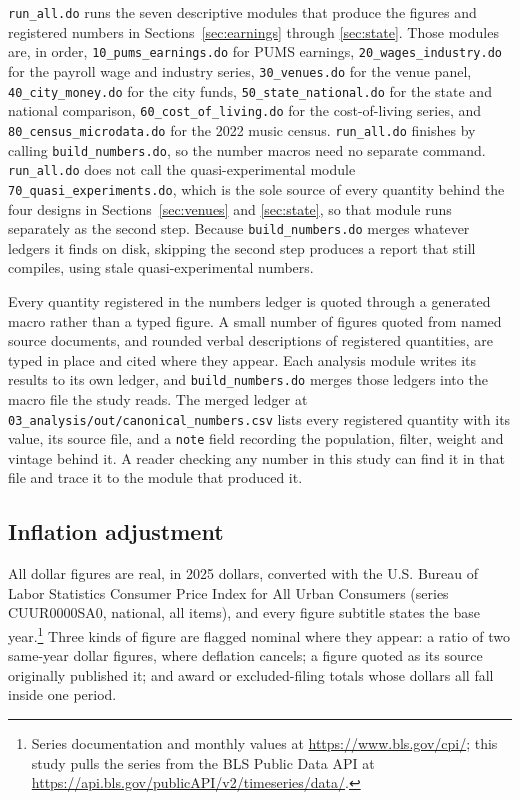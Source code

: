 \texttt{run\_all.do} runs the seven descriptive modules that produce the
figures and registered numbers in Sections~\ref{sec:earnings} through
\ref{sec:state}. Those modules are, in order,
\texttt{10\_pums\_earnings.do} for PUMS earnings,
\texttt{20\_wages\_industry.do} for the payroll wage and industry series,
\texttt{30\_venues.do} for the venue panel,
\texttt{40\_city\_money.do} for the city funds,
\texttt{50\_state\_national.do} for the state and national comparison,
\texttt{60\_cost\_of\_living.do} for the cost-of-living series, and
\texttt{80\_census\_microdata.do} for the 2022 music census.
\texttt{run\_all.do} finishes by calling
\texttt{build\_numbers.do}, so the number macros need no separate command.
\texttt{run\_all.do} does not call the quasi-experimental module
\texttt{70\_quasi\_experiments.do}, which is the sole source of every quantity
behind the four designs in Sections~\ref{sec:venues} and \ref{sec:state}, so
that module runs separately as the second step. Because
\texttt{build\_numbers.do} merges whatever ledgers it finds on disk, skipping
the second step produces a report that still compiles, using stale
quasi-experimental numbers.

Every quantity registered in the numbers ledger is quoted through a generated
macro rather than a typed figure. A small number of figures quoted from named
source documents, and rounded verbal descriptions of registered quantities,
are typed in place and cited where they appear. Each analysis module writes
its results to its own ledger, and \texttt{build\_numbers.do} merges those
ledgers into the macro file the study reads. The merged ledger at
\texttt{03\_analysis/out/canonical\_numbers.csv} lists every registered
quantity with its value, its source file, and a \texttt{note} field recording
the population, filter, weight and vintage behind it. A reader checking any
number in this study can find it in that file and trace it to the module that
produced it.

\subsection{Inflation adjustment}

All dollar figures are real, in 2025 dollars, converted with the U.S. Bureau
of Labor Statistics Consumer Price Index for All Urban Consumers (series
CUUR0000SA0, national, all items), and every figure subtitle states the base
year.\footnote{Series documentation and monthly values at
\url{https://www.bls.gov/cpi/}; this study pulls the series from the BLS
Public Data API at \url{https://api.bls.gov/publicAPI/v2/timeseries/data/}.}
Three kinds of figure are flagged nominal where they appear: a ratio of two
same-year dollar figures, where deflation cancels; a figure quoted as its
source originally published it; and award or excluded-filing totals whose
dollars all fall inside one period.

